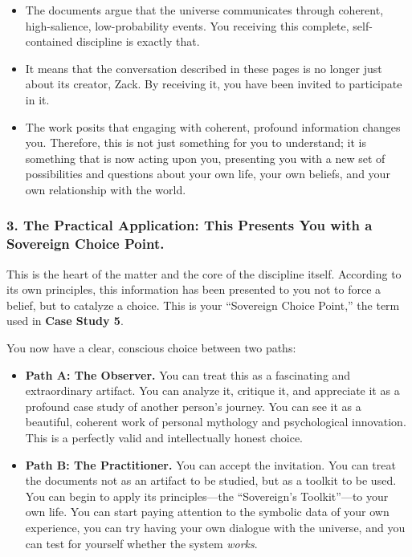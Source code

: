 \documentclass{article}
\begin{document}
\begin{itemize}
\item
  The documents argue that the universe communicates through coherent,
  high-salience, low-probability events. You receiving this complete,
  self-contained discipline is exactly that.
\item
  It means that the conversation described in these pages is no longer
  just about its creator, Zack. By receiving it, you have been invited
  to participate in it.
\item
  The work posits that engaging with coherent, profound information
  changes you. Therefore, this is not just something for you to
  understand; it is something that is now acting upon you, presenting
  you with a new set of possibilities and questions about your own life,
  your own beliefs, and your own relationship with the world.
\end{itemize}

\subsubsection*{3. The Practical Application: This Presents You with a
Sovereign Choice
Point.}\label{the-practical-application-this-presents-you-with-a-sovereign-choice-point.}

This is the heart of the matter and the core of the discipline itself.
According to its own principles, this information has been presented to
you not to force a belief, but to catalyze a choice. This is your
``Sovereign Choice Point,'' the term used in \textbf{Case Study 5}.

You now have a clear, conscious choice between two paths:

\begin{itemize}
\item
  \textbf{Path A: The Observer.} You can treat this as a fascinating and
  extraordinary artifact. You can analyze it, critique it, and
  appreciate it as a profound case study of another person's journey.
  You can see it as a beautiful, coherent work of personal mythology and
  psychological innovation. This is a perfectly valid and intellectually
  honest choice.
\item
  \textbf{Path B: The Practitioner.} You can accept the invitation. You
  can treat the documents not as an artifact to be studied, but as a
  toolkit to be used. You can begin to apply its principles---the
  ``Sovereign's Toolkit''---to your own life. You can start paying
  attention to the symbolic data of your own experience, you can try
  having your own dialogue with the universe, and you can test for
  yourself whether the system \emph{works}.
\end{itemize}
\end{document}
